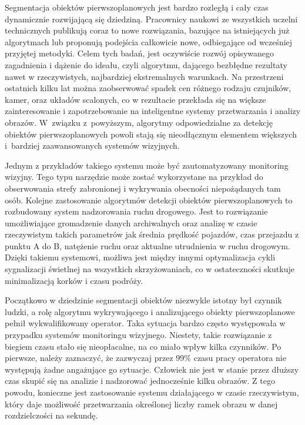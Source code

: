 Segmentacja obiektów pierwszoplanowych jest bardzo rozległą i cały czas dynamicznie rozwijającą się dziedziną. 
Pracownicy naukowi ze wszystkich uczelni technicznych publikują coraz to nowe rozwiązania, bazujące na istniejących już algorytmach lub proponują podejścia całkowicie nowe, odbiegające od wcześniej przyjętej metodyki.  
Celem tych badań, jest oczywiście rozwój opisywanego zagadnienia i dążenie do ideału, czyli algorytmu, dającego bezbłędne rezultaty nawet w rzeczywistych, najbardziej ekstremalnych warunkach. 
Na przestrzeni ostatnich kilku lat można zaobserwować spadek cen różnego rodzaju czujników, kamer, oraz układów scalonych, co w rezultacie przekłada się na większe zainteresowanie i zapotrzebowanie na inteligentne systemy przetwarzania i analizy obrazów. 
W~związku z~powyższym, algorytmy odpowiedzialne za detekcję obiektów pierwszoplanowych powoli stają się nieodłącznym elementem większych i~bardziej zaawansowanych systemów wizyjnych. 

Jednym z przykładów takiego systemu może być zautomatyzowany monitoring wizyjny. 
Tego typu narzędzie może zostać wykorzystane na przykład do obserwowania strefy zabronionej i wykrywania obecności niepożądanych tam osób. 
Kolejne zastosowanie algorytmów detekcji obiektów pierwszoplanowych to rozbudowany system nadzorowania ruchu drogowego. 
Jest to rozwiązanie umożliwiające gromadzenie danych archiwalnych oraz analizę w czasie rzeczywistym takich parametrów jak średnia prędkość pojazdów, czas przejazdu z punktu A do B, natężenie ruchu oraz aktualne utrudnienia w ruchu drogowym. 
Dzięki takiemu systemowi, możliwa jest między innymi optymalizacja cykli sygnalizacji świetlnej na wszystkich skrzyżowaniach, co w ostateczności skutkuje minimalizacją korków i czasu podróży.   

Początkowo w dziedzinie segmentacji obiektów niezwykle istotny był czynnik ludzki, a rolę algorytmu wykrywającego i analizującego obiekty pierwszoplanowe pełnił wykwalifikowany operator. 
Taka sytuacja bardzo często występowała w przypadku systemów monitoringu wizyjnego.
Niestety, takie rozwiązanie z biegiem czasu stało się nieopłacalne, na co miało wpływ kilka czynników. 
Po pierwsze, należy zaznaczyć, że zazwyczaj przez 99\% czasu pracy operatora nie występują żadne angażujące go sytuacje. 
Człowiek nie jest w stanie przez dłuższy czas skupić się na analizie i nadzorować jednocześnie kilku obrazów. 
Z tego powodu, konieczne jest zastosowanie systemu działającego w czasie rzeczywistym, który daje możliwość przetwarzania określonej liczby ramek obrazu w danej rozdzielczości na sekundę.


